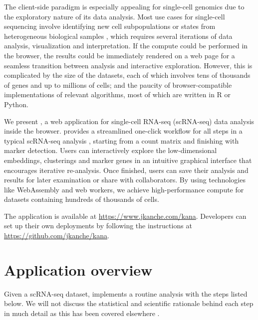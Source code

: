 \documentclass{article}
\begin{document}
The client-side paradigm is especially appealing for single-cell genomics due to the exploratory nature of its data analysis.
Most use cases for single-cell sequencing involve identifying new cell subpopulations or states from heterogeneous biological samples \cite{stegle2015computational},
which requires several iterations of data analysis, visualization and interpretation.
If the compute could be performed in the browser, the results could be immediately rendered on a web page for a seamless transition between analysis and interactive exploration.
However, this is complicated by the size of the datasets, each of which involves tens of thousands of genes and up to millions of cells;
and the paucity of browser-compatible implementations of relevant algorithms, most of which are written in R or Python.

We present , a web application for single-cell RNA-seq (scRNA-seq) data analysis inside the browser.
 provides a streamlined one-click workflow for all steps in a typical scRNA-seq analysis \cite{amezquita2020orchestrating}, 
starting from a count matrix and finishing with marker detection.
Users can interactively explore the low-dimensional embeddings, clusterings and marker genes in an intuitive graphical interface that encourages iterative re-analysis.
Once finished, users can save their analysis and results for later examination or share with collaborators.
By using technologies like WebAssembly and web workers, we achieve high-performance compute for datasets containing hundreds of thousands of cells.

The  application is available at \url{https://www.jkanche.com/kana}.
Developers can set up their own deployments by following the instructions at \url{https://github.com/jkanche/kana}.

\section{Application overview}

Given a scRNA-seq dataset,  implements a routine analysis with the steps listed below.
We will not discuss the statistical and scientific rationale behind each step in much detail as this has been covered elsewhere \cite{oscabook}.
\end{document}
